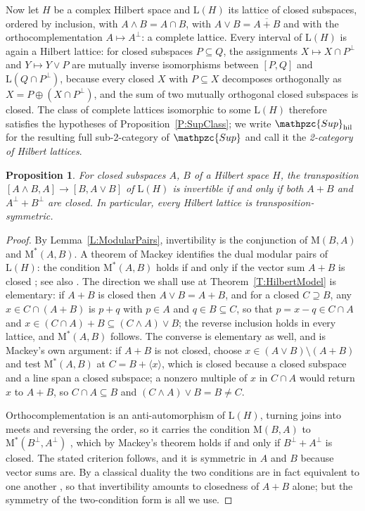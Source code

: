 \documentclass[reqno,a4paper]{amsart}
\numberwithin{equation}{section}
\theoremstyle{plain}
\newtheorem{proposition}[subsection]{Proposition}
\theoremstyle{definition}
\def\nameit#1{\textrm{#1}~}
\def\thex{\nameit{Theorem}}
\def\prox{\nameit{Proposition}}
\def\lemx{\nameit{Lemma}}
\def\dfn#1{{\itshape #1}}
\newcommand{\catfont}[1]{\ensuremath{\mathpzc{#1}}\xspace}
\newcommand{\Sup}{\catfont{Sup}}
\newcommand{\Suphil}{\ensuremath{\mathpzc{Sup}_{\mathrm{hil}}}}
\renewcommand{\1}{\onecat{1}}
\newcommand{\Lat}{\ensuremath{\mathrm{L}}}
\begin{document}
Now let \(H\) be a complex Hilbert space and \(\Lat(H)\) its lattice of closed subspaces, ordered by inclusion, with \(A\wedge B=A\cap B\), with \(A\vee B=\overline{A+B}\) and with the orthocomplementation \(A\mapsto A^{\perp}\): a complete lattice. Every interval of \(\Lat(H)\) is again a Hilbert lattice: for closed subspaces \(P\subseteq Q\), the assignments \(X\mapsto X\cap P^{\perp}\) and \(Y\mapsto Y\vee P\) are mutually inverse isomorphisms between \([P,Q]\) and \(\Lat(Q\cap P^{\perp})\), because every closed \(X\) with \(P\subseteq X\) decomposes orthogonally as \(X=P\oplus(X\cap P^{\perp})\), and the sum of two mutually orthogonal closed subspaces is closed. The class of complete lattices isomorphic to some \(\Lat(H)\) therefore satisfies the hypotheses of \prox\ref{P:SupClass}; we write \(\Suphil\) for the resulting full sub-2-category of \(\Sup\) and call it the \dfn{2-category of Hilbert lattices}.

\begin{proposition}\label{P:HilbertSymmetric}
	For closed subspaces \(A\), \(B\) of a Hilbert space \(H\), the transposition \([A\wedge B,A]\to[B,A\vee B]\) of \(\Lat(H)\) is invertible if and only if both \(A+B\) and \(A^{\perp}+B^{\perp}\) are closed. In particular, every Hilbert lattice is transposition-symmetric.
\end{proposition}
\begin{proof}
	By \lemx\ref{L:ModularPairs}, invertibility is the conjunction of \(\mathrm{M}(B,A)\) and \(\mathrm{M}^{*}(A,B)\). A theorem of Mackey identifies the dual modular pairs of \(\Lat(H)\): the condition \(\mathrm{M}^{*}(A,B)\) holds if and only if the vector sum \(A+B\) is closed \cite[Theorem~III-6]{Mackey45}; see also \cite{Schreiner66}. The direction we shall use at \thex\ref{T:HilbertModel} is elementary: if \(A+B\) is closed then \(A\vee B=A+B\), and for a closed \(C\supseteq B\), any \(x\in C\cap(A+B)\) is \(p+q\) with \(p\in A\) and \(q\in B\subseteq C\), so that \(p=x-q\in C\cap A\) and \(x\in(C\cap A)+B\subseteq(C\wedge A)\vee B\); the reverse inclusion holds in every lattice, and \(\mathrm{M}^{*}(A,B)\) follows. The converse is elementary as well, and is Mackey's own argument: if \(A+B\) is not closed, choose \(x\in(A\vee B)\setminus(A+B)\) and test \(\mathrm{M}^{*}(A,B)\) at \(C=B+\langle x\rangle\), which is closed because a closed subspace and a line span a closed subspace; a nonzero multiple of \(x\) in \(C\cap A\) would return \(x\) to \(A+B\), so \(C\cap A\subseteq B\) and \((C\wedge A)\vee B=B\neq C\).

	Orthocomplementation is an anti-automorphism of \(\Lat(H)\), turning joins into meets and reversing the order, so it carries the condition \(\mathrm{M}(B,A)\) to \(\mathrm{M}^{*}(B^{\perp},A^{\perp})\) \cite[Theorem~5(i)]{Schreiner66}, which by Mackey's theorem holds if and only if \(B^{\perp}+A^{\perp}\) is closed. The stated criterion follows, and it is symmetric in \(A\) and \(B\) because vector sums are. By a classical duality the two conditions are in fact equivalent to one another \cite[Theorem~IV.4.8]{Kato}, so that invertibility amounts to closedness of \(A+B\) alone; but the symmetry of the two-condition form is all we use.
\end{proof}
\end{document}

